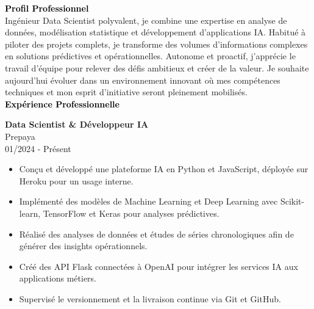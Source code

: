 \documentclass{article}
\begin{document}
\begin{paracol}{2}
\textcolor{black}{\Large \textbf{Profil Professionnel}} \\[2pt]
Ingénieur Data Scientist polyvalent, je combine une expertise en analyse de données, modélisation statistique et développement d’applications IA. Habitué à piloter des projets complets, je transforme des volumes d’informations complexes en solutions prédictives et opérationnelles. Autonome et proactif, j’apprécie le travail d’équipe pour relever des défis ambitieux et créer de la valeur. Je souhaite aujourd’hui évoluer dans un environnement innovant où mes compétences techniques et mon esprit d’initiative seront pleinement mobilisés. \\[8pt]

\textcolor{black}{\Large \textbf{Expérience Professionnelle}} \\[2pt]

\colorbox{maincolor}{%
  \begin{minipage}{\linewidth}
    \textbf{Data Scientist \& Développeur IA} \\ Prepaya \\ 01/2024 - Présent
    \begin{itemize}
      \item Conçu et développé une plateforme IA en Python et JavaScript, déployée sur Heroku pour un usage interne. \item Implémenté des modèles de Machine Learning et Deep Learning avec Scikit-learn, TensorFlow et Keras pour analyses prédictives. \item Réalisé des analyses de données et études de séries chronologiques afin de générer des insights opérationnels. \item Créé des API Flask connectées à OpenAI pour intégrer les services IA aux applications métiers. \item Supervisé le versionnement et la livraison continue via Git et GitHub.
    \end{itemize}
  \end{minipage}}

\vspace{3mm}



\end{paracol}
\end{document}

